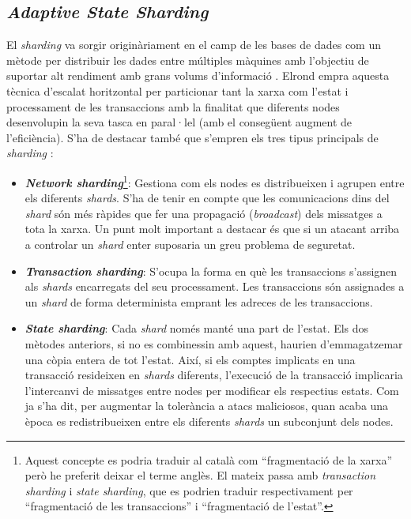 \documentclass[11pt,a4paper]{article}
\begin{document}
\subsection{\textit{Adaptive State Sharding}}
El \textit{sharding} va sorgir originàriament en el camp de les bases de dades com un mètode per distribuir les dades entre múltiples màquines amb l'objectiu de suportar alt rendiment amb grans volums d'informació \cite{mongodb2021}. Elrond empra aquesta tècnica d'escalat horitzontal per particionar tant la xarxa com l'estat i processament de les transaccions amb la finalitat que diferents nodes desenvolupin la seva tasca en paral·lel (amb el consegüent augment de l'eficiència). S'ha de destacar també que s'empren els tres tipus principals de \textit{sharding} \cite{elrond2022}:

\begin{itemize}
	\item \textbf{\textit{Network sharding}}\footnote{Aquest concepte es podria traduir al català com ``fragmentació de la xarxa'' però he preferit deixar el terme anglès. El mateix passa amb \textit{transaction sharding} i \textit{state sharding}, que es podrien traduir respectivament per ``fragmentació de les transaccions'' i ``fragmentació de l'estat''.}: Gestiona com els nodes es distribueixen i agrupen entre els diferents \textit{shards}. S'ha de tenir en compte que les comunicacions dins del \textit{shard} són més ràpides que fer una propagació (\textit{broadcast}) dels missatges a tota la xarxa. Un punt molt important a destacar és que si un atacant arriba a controlar un \textit{shard} enter suposaria un greu problema de seguretat. 
	\item \textbf{\textit{Transaction sharding}}: S'ocupa la forma en què les transaccions s'assignen als \textit{shards} encarregats del seu processament. Les transaccions són assignades a un \textit{shard} de forma determinista emprant les adreces de les transaccions.
	\item \textbf{\textit{State sharding}}: Cada \textit{shard} només manté una part de l'estat. Els dos mètodes anteriors, si no es combinessin amb aquest, haurien d'emmagatzemar una còpia entera de tot l'estat. Així, si els comptes implicats en una transacció resideixen en \textit{shards} diferents, l'execució de la transacció implicaria l'intercanvi de missatges entre nodes per modificar els respectius estats. Com ja s'ha dit, per augmentar la tolerància a atacs maliciosos, quan acaba una època es redistribueixen entre els diferents \textit{shards} un subconjunt dels nodes.
\end{itemize}
\end{document}
